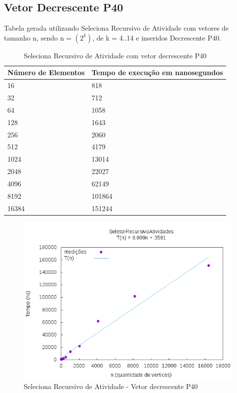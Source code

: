 \documentclass[12pt,a4paper,twoside]{report}
\begin{document}
\subsection{Vetor Decrescente P40}
Tabela gerada utilizando Seleciona Recursivo de Atividade com vetores de tamanho n, sendo n = $(2^k)$, de k = 4..14 e inseridos Decrescente P40.
\begin{table}[H]
\centering
\caption{Seleciona Recursivo de Atividade com vetor decrescente P40}
\label{my-label}
\begin{tabular}{|l|l|}
\hline
\multicolumn{1}{|c|}{\textbf{Número de Elementos}} & \multicolumn{1}{c|}{\textbf{Tempo de execução em nanosegundos}} \\ \hline
16 & 818 \\ \hline
32 & 712 \\ \hline
64 & 1058 \\ \hline
128 & 1643 \\ \hline
256 & 2060 \\ \hline
512 & 4179 \\ \hline
1024 & 13014 \\ \hline
2048 & 22027 \\ \hline
4096 & 62149 \\ \hline
8192 & 101864 \\ \hline
16384 & 151244 \\ \hline

\end{tabular}
\end{table}

\begin{figure}[H]
    \centering
    \includegraphics[width=0.7\linewidth]{graficos/SeletorRecursivoAtividades/Decrescente P40/SelecionaAleatorizado.png}
  \caption{Seleciona Recursivo de Atividade - Vetor decrescente P40}
\end{figure}
\end{document}

